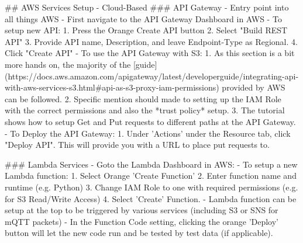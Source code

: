 \begin{markdown}
## AWS Services Setup - Cloud-Based
### API Gateway - Entry point into all things AWS
- First navigate to the API Gateway Dashboard in AWS
- To setup new API:
    1. Press the Orange Create API button
    2. Select "Build REST API"
    3. Provide API name, Description, and leave Endpoint-Type as Regional.
    4. Click "Create API"
- To use the API Gateway with S3:
    1. As this section is a bit more hands on, the majority of the [guide](https://docs.aws.amazon.com/apigateway/latest/developerguide/integrating-api-with-aws-services-s3.html#api-as-s3-proxy-iam-permissions) provided by AWS can be followed. 
    2. Specific mention should made to setting up the IAM Role with the correct permissions and also the *trust policy* setup.
    3. The tutorial shows how to setup Get and Put requests to different paths at the API Gateway. 
- To Deploy the API Gateway:
    1. Under 'Actions' under the Resource tab, click "Deploy API". This will provide you with a URL to place put requests to.
    
### Lambda Services
- Goto the Lambda Dashboard in AWS:
- To setup a new Lambda function:
    1. Select Orange 'Create Function'
    2. Enter function name and runtime (e.g. Python)
    3. Change IAM Role to one with required permissions (e.g. for S3 Read/Write Access)
    4. Select 'Create' Function.
- Lambda function can be setup at the top to be triggered by various services  (including S3 or SNS for mQTT packets)
- In the Function Code setting, clicking the orange 'Deploy' button will let the new code run and be tested by test data (if applicable).


\end{markdown}
